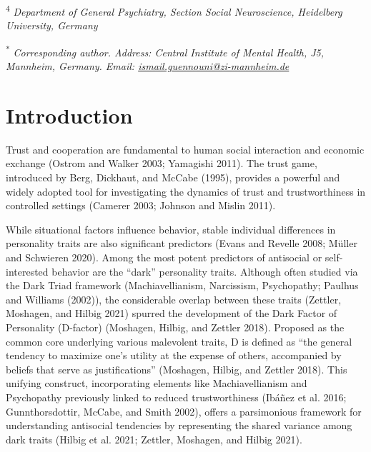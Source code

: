 \documentclass[
]{article}
\begin{document}
\textsuperscript{4} \emph{Department of General Psychiatry, Section Social Neuroscience,
Heidelberg University, Germany}

\textsuperscript{*} \emph{Corresponding author. Address: Central Institute of Mental Health,
J5, Mannheim, Germany. Email:
\href{mailto:ismail.guennouni@iwr.uni-heidelberg.de}{ismail.guennouni@zi-mannheim.de}}

\pagebreak

\section{Introduction}\label{introduction}

Trust and cooperation are fundamental to human social interaction and economic exchange (Ostrom and Walker 2003; Yamagishi 2011). The trust game, introduced by Berg, Dickhaut, and McCabe (1995), provides a powerful and widely adopted tool for investigating the dynamics of trust and trustworthiness in controlled settings (Camerer 2003; Johnson and Mislin 2011).

While situational factors influence behavior, stable individual differences in personality traits are also significant predictors (Evans and Revelle 2008; Müller and Schwieren 2020). Among the most potent predictors of antisocial or self-interested behavior are the ``dark'' personality traits. Although often studied via the Dark Triad framework (Machiavellianism, Narcissism, Psychopathy; Paulhus and Williams (2002)), the considerable overlap between these traits (Zettler, Moshagen, and Hilbig 2021) spurred the development of the Dark Factor of Personality (D-factor) (Moshagen, Hilbig, and Zettler 2018). Proposed as the common core underlying various malevolent traits, D is defined as ``the general tendency to maximize one's utility at the expense of others, accompanied by beliefs that serve as justifications'' (Moshagen, Hilbig, and Zettler 2018). This unifying construct, incorporating elements like Machiavellianism and Psychopathy previously linked to reduced trustworthiness (Ibáñez et al. 2016; Gunnthorsdottir, McCabe, and Smith 2002), offers a parsimonious framework for understanding antisocial tendencies by representing the shared variance among dark traits (Hilbig et al. 2021; Zettler, Moshagen, and Hilbig 2021).
\end{document}
